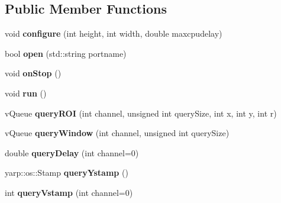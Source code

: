 \subsection*{Public Member Functions}
\begin{DoxyCompactItemize}
\item 
void {\bfseries configure} (int height, int width, double maxcpudelay)\hypertarget{classev_1_1hSurfThread_a17acb3eb05f063ab81ab5128986ed7c8}{}\label{classev_1_1hSurfThread_a17acb3eb05f063ab81ab5128986ed7c8}

\item 
bool {\bfseries open} (std\+::string portname)\hypertarget{classev_1_1hSurfThread_afa2fc93ae2c64231e566738ebfddabf1}{}\label{classev_1_1hSurfThread_afa2fc93ae2c64231e566738ebfddabf1}

\item 
void {\bfseries on\+Stop} ()\hypertarget{classev_1_1hSurfThread_a7897b02f77738563c0d2fd5123dc4c51}{}\label{classev_1_1hSurfThread_a7897b02f77738563c0d2fd5123dc4c51}

\item 
void {\bfseries run} ()\hypertarget{classev_1_1hSurfThread_af4a0a8b35321419785dce1b94e43e5e3}{}\label{classev_1_1hSurfThread_af4a0a8b35321419785dce1b94e43e5e3}

\item 
v\+Queue {\bfseries query\+R\+OI} (int channel, unsigned int query\+Size, int x, int y, int r)\hypertarget{classev_1_1hSurfThread_ada4a11e319f5f0122897e21d6411bb1a}{}\label{classev_1_1hSurfThread_ada4a11e319f5f0122897e21d6411bb1a}

\item 
v\+Queue {\bfseries query\+Window} (int channel, unsigned int query\+Size)\hypertarget{classev_1_1hSurfThread_a89e485321978fdf785ba0e4e3b08a7ec}{}\label{classev_1_1hSurfThread_a89e485321978fdf785ba0e4e3b08a7ec}

\item 
double {\bfseries query\+Delay} (int channel=0)\hypertarget{classev_1_1hSurfThread_ae50c10e866f8692aae342d75e38369e7}{}\label{classev_1_1hSurfThread_ae50c10e866f8692aae342d75e38369e7}

\item 
yarp\+::os\+::\+Stamp {\bfseries query\+Ystamp} ()\hypertarget{classev_1_1hSurfThread_a02f2a70c6f8147e70e1689520555c389}{}\label{classev_1_1hSurfThread_a02f2a70c6f8147e70e1689520555c389}

\item 
int {\bfseries query\+Vstamp} (int channel=0)\hypertarget{classev_1_1hSurfThread_af5da61e8087f133f2202c873660779bc}{}\label{classev_1_1hSurfThread_af5da61e8087f133f2202c873660779bc}

\end{DoxyCompactItemize}


